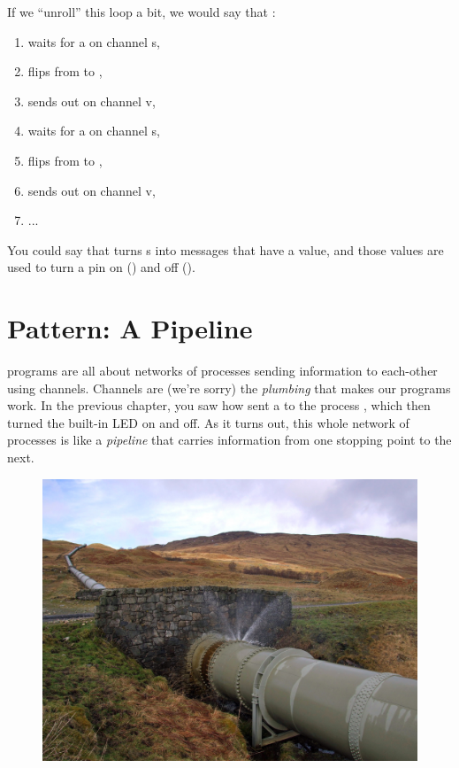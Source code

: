 \vspace{3mm}
If we ``unroll'' this loop a bit, we would say that \toggle:

\vspace{3mm}
\begin{enumerate}
	\item waits for a \SIGNALT on channel {\code s},
	\item flips from \LOW to \HIGH,
	\item sends \HIGH out on channel {\code v},
	\item waits for a \SIGNALT on channel {\code s},
	\item flips from \HIGH to \LOW,
	\item sends \LOW out on channel {\code v},
	\item ...
\end{enumerate}

You could say that \toggle turns {\SIGNALT}s into messages that have a value, and those values are used to turn a pin on (\HIGH) and off (\LOW).

\newpage

\section{Pattern: A Pipeline}
\plumbing programs are all about networks of processes sending information to each-other using channels. Channels are (we're sorry) the {\em plumbing} that makes our programs work. In the previous chapter, you saw how \bp sent a \SIGNALV to the process \tp, which then turned the built-in LED on and off. As it turns out, this whole network of processes is like a {\em pipeline} that carries information from one stopping point to the next.

\vspace{3mm}
\begin{figure}[!ht]
  \begin{center}
    \includegraphics[width=\linewidth]{images/scotland-pipeline}
    \label{image:scotland-pipeline}
  \end{center}
\end{figure}

